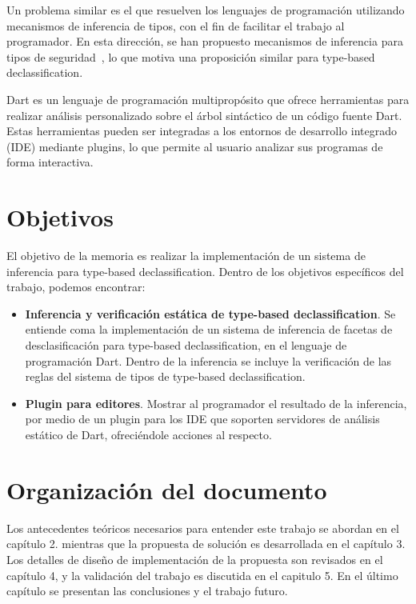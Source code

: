 \begin{intro}
	Un problema similar es el que resuelven los lenguajes de programación utilizando mecanismos de inferencia de tipos, con el fin de facilitar el trabajo al programador. En esta dirección, se han propuesto mecanismos de inferencia para tipos de seguridad~\cite{Pottier}, lo que motiva una proposición similar para type-based declassification.

	Dart es un lenguaje de programación multipropósito que ofrece herramientas para realizar análisis personalizado sobre el árbol sintáctico de un código fuente Dart. Estas herramientas pueden ser integradas a los entornos de desarrollo integrado (IDE) mediante plugins, lo que permite al usuario analizar sus programas de forma interactiva.

	\section{Objetivos}
	El objetivo de la memoria es realizar la implementación de un sistema de inferencia para type-based declassification. Dentro de los objetivos específicos del trabajo, podemos encontrar:

	\begin{itemize}
	\item \textbf{Inferencia y verificación estática de type-based declassification}. Se entiende coma la implementación de un sistema de inferencia de facetas de desclasificación para type-based declassification, en el lenguaje de programación Dart. Dentro de la inferencia se incluye la verificación de las reglas del sistema de tipos de type-based declassification.

	\item \textbf{Plugin para editores}. Mostrar al programador el resultado de la inferencia, por medio de un plugin para los IDE que soporten servidores de análisis estático de Dart, ofreciéndole acciones al respecto.

	\end{itemize}

	\section{Organización del documento}

	Los antecedentes teóricos necesarios para entender este trabajo se abordan en el capítulo 2. mientras que la propuesta de solución es desarrollada en el capítulo 3. Los detalles de diseño de implementación de la propuesta son revisados en el capítulo 4, y la validación del trabajo es discutida en el capitulo 5. En el último capítulo se presentan las conclusiones y el trabajo futuro.

\end{intro}
